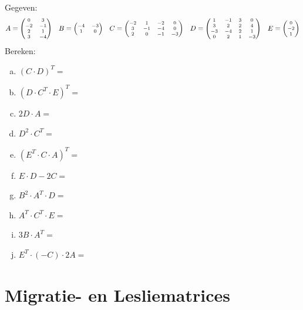 \documentclass[12pt,twoside]{article}
\begin{document}
\begin{oefening}\\
Gegeven:
$$
\scriptsize
A=\begin{pmatrix}
  0 & 3\\
  -2 & -1\\
  2 & 1\\
  3 & -4
\end{pmatrix}
\quad
B=\begin{pmatrix}
  -4 & -3\\
  1 & 0\\
\end{pmatrix}
\quad
C=\begin{pmatrix}
  -2 & 1 & -2 & 0\\
  3 & -1 & -4 & 0\\
  2 & 0 & -1 & -3\\
\end{pmatrix}
\quad
D=\begin{pmatrix}
  1 & -1 & 3 & 0\\
  3 & 2 & 2 & 4\\
  -3 & -4 & 2 & 1\\
  0 & 2 & 1 & -3\\
\end{pmatrix}
\quad
E=\begin{pmatrix}
  0\\
  -2\\
  1\\
\end{pmatrix}
$$
Bereken:
\begin{multicols}{2}
  \begin{enumerate}[(a)]
    \itemsep1em
    \item $(C\cdot D)^T=$
    \item $(D\cdot C^T\cdot E)^T=$
    \item $2D\cdot A=$
    \item $D^2\cdot C^T=$
    \item $(E^T\cdot C\cdot A)^T=$
    \item $E\cdot D - 2C=$
    \item $B^2\cdot A^T\cdot D=$
    \item $A^T\cdot C^T\cdot E=$
    \item $3B\cdot A^T=$
    \item $E^T\cdot(-C)\cdot 2A=$
  \end{enumerate}
\end{multicols}
\end{oefening}

\pagebreak
\section{Migratie- en Lesliematrices}
\end{document}
